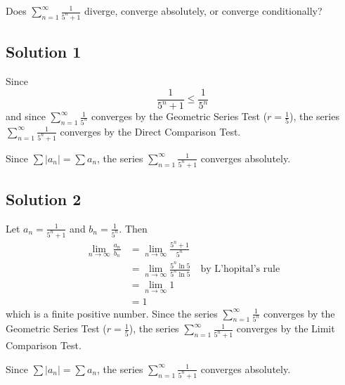\documentclass{article}
\begin{document}
\noindent
Does $\displaystyle \sum_{n=1}^\infty \frac{1}{5^n+1}$
diverge, converge absolutely, or converge conditionally?

\subsection*{Solution 1}

Since 
\[ \frac{1}{5^n+1} \leq \frac{1}{5^n}\]
and since $\displaystyle \sum_{n=1}^\infty  \frac{1}{5^n}$ converges by the Geometric Series Test ($r=\frac15$), the series $\displaystyle \sum_{n=1}^\infty \frac{1}{5^n+1}$ converges by the Direct Comparison Test.

Since $\sum |a_n| = \sum a_n$, the series $\displaystyle \sum_{n=1}^\infty \frac{1}{5^n+1}$ converges absolutely.

\subsection*{Solution 2}

Let $a_n =  \frac{1}{5^n+1}$ and $b_n = \frac{1}{5^n}$. Then
\begin{align*}
\lim_{n \to \infty} \frac{a_n}{b_n}
&= \lim_{n \to \infty} \frac{5^n+1}{5^n} \\
&= \lim_{n \to \infty} \frac{5^n \ln 5}{5^n \ln 5}\quad\text{by L'hopital's rule} \\
& = \lim_{n \to \infty} 1\\
& = 1
\end{align*}
which is a finite positive number. Since the series  $\displaystyle \sum_{n=1}^\infty  \frac{1}{5^n}$ converges by the Geometric Series Test ($r=\frac15$), the series $\displaystyle \sum_{n=1}^\infty \frac{1}{5^n+1}$ converges by the Limit Comparison Test.

Since $\sum |a_n| = \sum a_n$, the series $\displaystyle \sum_{n=1}^\infty \frac{1}{5^n+1}$ converges absolutely.
\end{document}
